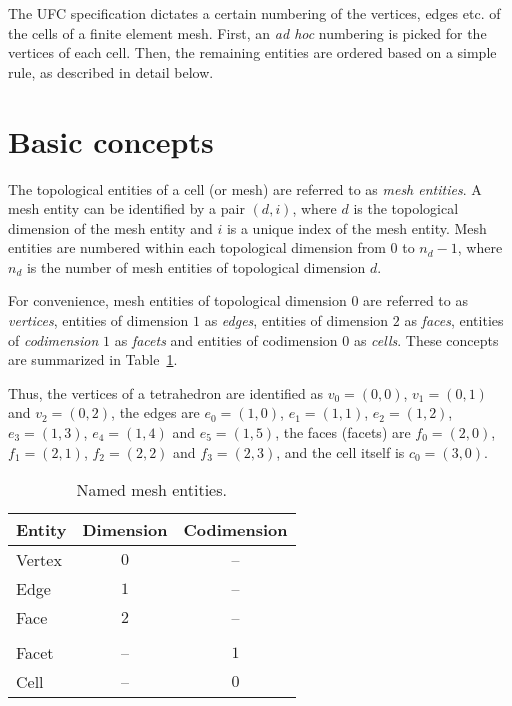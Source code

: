 
The UFC specification dictates a certain numbering of the vertices,
edges etc. of the cells of a finite element mesh. First, an \emph{ad
hoc} numbering is picked for the vertices of each cell. Then, the
remaining entities are ordered based on a simple rule, as described in
detail below.

\section{Basic concepts}

The topological entities of a cell (or mesh) are referred to as
\emph{mesh entities}. A mesh entity can be identified by a pair
$(d, i)$, where $d$ is the topological dimension of the mesh entity and $i$
is a unique index of the mesh entity. Mesh entities are numbered
within each topological dimension from $0$ to $n_d-1$, where $n_d$ is
the number of mesh entities of topological dimension $d$.

For convenience, mesh entities of topological dimension $0$ are
referred to as \emph{vertices}, entities of dimension $1$
as \emph{edges}, entities of dimension $2$ as \emph{faces}, entities of
\emph{codimension} $1$ as \emph{facets} and entities of codimension
$0$ as \emph{cells}. These concepts are summarized in
Table~\ref{tab:entities}.

Thus, the vertices of a tetrahedron are identified as
$v_0 = (0, 0)$, $v_1 = (0, 1)$ and $v_2 = (0, 2)$,
the edges are
$e_0 = (1, 0)$, $e_1 = (1, 1)$, $e_2 = (1, 2)$,
$e_3 = (1, 3)$, $e_4 = (1, 4)$ and $e_5 = (1, 5)$,
the faces (facets) are
$f_0 = (2, 0)$, $f_1 = (2, 1)$, $f_2 = (2, 2)$ and $f_3 = (2, 3)$,
and the cell itself is
$c_0 = (3, 0)$.

\begin{table}[H]
\linespread{1.2}\selectfont
  \begin{center}
    \begin{tabular}{|l|c|c|}
      \hline
      Entity & Dimension & Codimension \\
      \hline
      Vertex & $0$       & -- \\
      Edge   & $1$       & -- \\
      Face   & $2$       & -- \\
      & & \\
      Facet  & --      &  $1$ \\
      Cell   & --      &  $0$ \\
      \hline
    \end{tabular}
    \caption{Named mesh entities.}
    \label{tab:entities}
  \end{center}
\end{table}

